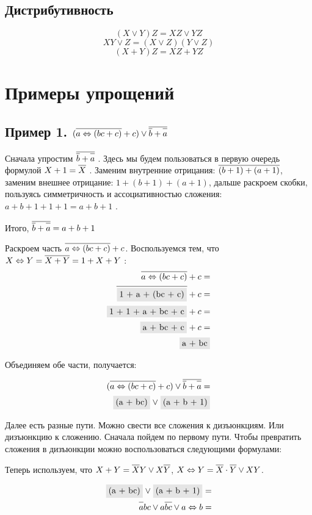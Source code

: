 \documentclass{article}
\numberwithin{equation}{subsection}
\renewcommand{\[}{\begin{equation}}
\renewcommand{\]}{\end{equation}}
\newcommand{\bx}[1]{\fcolorbox{white}{gray!20}{#1}}
\newcommand{\NE}[1]{\overline{\vphantom{|} #1}}
\newcommand{\EQ}{\Leftrightarrow}
\newcommand{\OR}{\vee}
\begin{document}
\subsection{Дистрибутивность}
\[(X\vee Y)Z = XZ \vee YZ\]
\[XY \vee Z = (X \vee Z)(Y \vee Z)\]
\[(X+ Y)Z = XZ + YZ\]

\section{Примеры упрощений}
\label{sec:examples}
\subsection{Пример 1.
$(\NE {a\Leftrightarrow (bc+ c)} + c)\vee \NE {\NE b+\NE a}$
}

Сначала упростим $\NE {\NE b+\NE a}$ . Здесь мы будем пользоваться в первую очередь формулой $ X + 1 = \NE X$ . Заменим внутренние отрицания: $\NE {(b + 1) +(a + 1)}$, заменим внешнее отрицание: $ 1 + (b + 1) + (a + 1)$, дальше раскроем скобки, пользуясь симметричность и ассоциативностью сложения: $ a + b + 1 + 1 + 1 = a + b + 1 $ .

Итого, $\NE {\NE b+\NE a} = a + b + 1 $

Раскроем часть $\NE {a\Leftrightarrow (bc+ c)} + c $. Воспользуемся тем, что $ X\Leftrightarrow Y=\NE{X + Y} = 1 + X + Y $ :
\begin{align}
\NE {a\Leftrightarrow (bc+ c)} + c = \\
\NE {\bx{1 + a + (bc + c)}} + c = \\
\bx{1 + 1 + a + bc + c} + c = \\
\bx{a + bc + c} + c = \\
\bx{a + bc}
\end{align}

Объединяем обе части, получается:

\begin{align}
(\NE {a\Leftrightarrow (bc+ c)} + c)\vee \NE {\NE b+\NE a} = \\
\bx{(a + bc)} \vee \bx{(a + b + 1)}
\end{align}

Далее есть разные пути. Можно свести все сложения к дизъюнкциям. Или дизъюнкцию к сложению.
Сначала пойдем по первому пути. Чтобы превратить сложения в дизъюнкции можно воспользоваться следующими формулами:

Теперь используем, что $X + Y = \NE{X}Y \vee X\NE{Y}$,
$X \Leftrightarrow Y = \NE{X}\cdot\NE{Y} \vee XY$.

\begin{align}
\bx{(a + bc)} \vee \bx{(a + b + 1)} = \\
\NE{a}bc \OR a\NE{bc} \vee a\EQ b =
\end{align}
\end{document}
